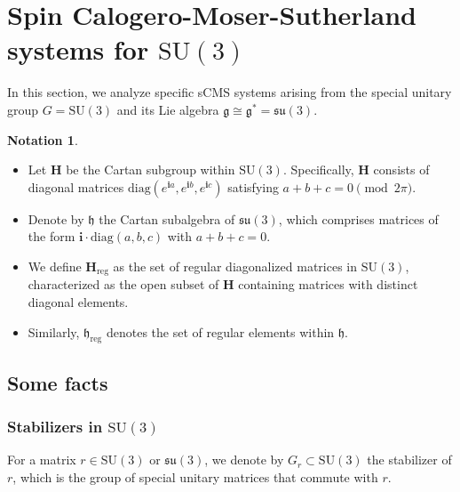 \documentclass[12pt]{amsart}
\theoremstyle{definition}
\newtheorem{notation}[theorem]{Notation}
\numberwithin{equation}{section}
\def\diag{\mathrm{diag}}
\newcommand{\imagunit}{\mathbf{i}}
\newcommand{\SU}{\mathrm{SU}}
\newcommand{\su}{\mathfrak{su}}
\newcommand{\SUthree}{\SU(3)}
\newcommand{\Hreg}{\Cartan_{\mathrm{reg}}}
\newcommand{\hreg}{\mathfrak{h}_{\mathrm{reg}}}
\newcommand{\Cartan}{\mathbf{H}}
\newcommand{\cartan}{\mathfrak{h}}
\begin{document}
	\section{Spin Calogero-Moser-Sutherland  systems   for   $ \SUthree$}\label{Sec:sCMSRPBSU3}


 


In this section, we analyze   specific sCMS systems arising from the special unitary group  \( G = \SU(3) \) and its Lie algebra \( \mathfrak{g} \cong \mathfrak{g}^* = \su(3) \).  


\begin{notation}
	\begin{itemize}
		\item Let $\Cartan$ be the Cartan subgroup within $\SU(3)$. Specifically, $\Cartan$ consists of diagonal matrices $\diag( e^{\imagunit  a},e^{\imagunit  b},e^{ \imagunit  c})$ satisfying $a+b+c=0 \pmod {2\pi}$. 
		\item Denote by $\cartan$ the Cartan subalgebra of $\su(3)$, which comprises   matrices of the form $\imagunit \cdot \diag(a,b,c)$ with $a+b+c=0$. 
		\item We define $\Hreg$ as the set of regular diagonalized matrices in $\SU(3)$, characterized as the open subset of $\Cartan$ containing matrices with distinct diagonal elements.
		\item Similarly, $\hreg$ denotes the set of regular elements within $\cartan$.
	\end{itemize}
\end{notation}

\subsection{Some facts}

\subsubsection{Stabilizers in $\SUthree$}\label{Sec:stabilizerinSUthree}

For a matrix $r\in \SUthree$ or $\su(3)$, we denote  by \( G_r \subset \SUthree \)   the stabilizer of \( r \), which is the group of special unitary matrices that commute with \( r \). 
\end{document}
